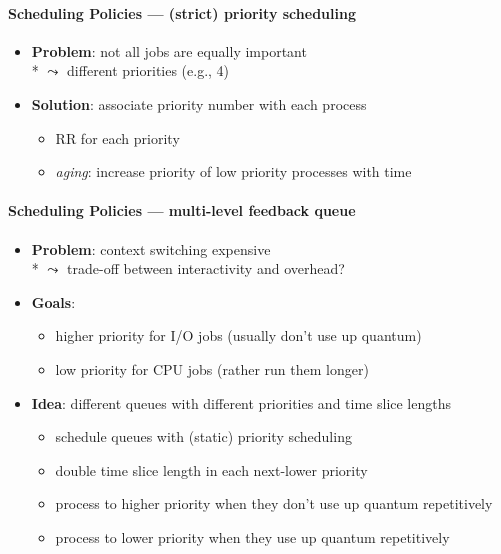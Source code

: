 \paragraph{Scheduling Policies --- (strict) priority scheduling}
\begin{itemize}
  \item \textbf{Problem}: not all jobs are equally important \\*
    \( \leadsto \) different priorities (e.g., 4)
  \item \textbf{Solution}: associate priority number with each process
  \begin{itemize}
    \item RR for each priority
    \item \emph{aging}: increase priority of low priority processes with time
  \end{itemize}
\end{itemize}

\paragraph{Scheduling Policies --- multi-level feedback queue}
\begin{itemize}
  \item \textbf{Problem}: context switching expensive \\*
    \( \leadsto \) trade-off between interactivity and overhead?
  \item \textbf{Goals}:
  \begin{itemize}
    \item higher priority for I/O jobs (usually don't use up quantum)
    \item low priority for CPU jobs (rather run them longer)
  \end{itemize}
  \item \textbf{Idea}: different queues with different priorities and time slice lengths
  \begin{itemize}
    \item schedule queues with (static) priority scheduling
    \item double time slice length in each next-lower priority
    \item process to higher priority when they don't use up quantum repetitively
    \item process to lower priority when they use up quantum repetitively
  \end{itemize}
\end{itemize}

